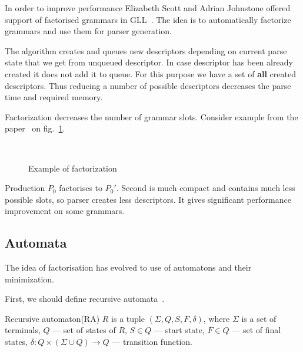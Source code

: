 \documentclass[runningheads,a4paper]{llncs}
\begin{document}
In order to improve performance Elizabeth Scott and Adrian Johnstone offered support of factorised grammars in GLL~\cite{scott2016structuring}. 
The idea is to automatically factorize grammars and use them for parser generation. 

The algorithm creates and queues new descriptors depending on current parse state that we get from unqueued descriptor. 
In case descriptor has been already created it does not add it to queue. For this purpose we have a set of
\textbf{all} created descriptors. Thus reducing a number of possible descriptors decreases the parse time
and required memory.

Factorization decreases the number of grammar slots. 
Consider example from the paper~\cite{scott2016structuring} on fig.~\ref{fig:ExampleOfFactorization}.

\begin{figure}
    \centering
    ~
    \caption{Example of factorization}
    \label{fig:ExampleOfFactorization}
\end{figure}
Production $P_0$ factorises to $P_0'$.
Second is much compact and contains much less possible slots, 
so parser creates less descriptors.
It gives significant performance improvement on some grammars.

\subsection{Automata}
The idea of factorisation has evolved to use of automatons and their minimization.

First, we should define recursive automata~\cite{tellier2006learning}.

\begin{mydef}
    Recursive automaton(RA) $R$ is a tuple $(\Sigma, Q, S, F, \delta)$, where
    $\Sigma$ is a set of terminals,
    $Q$ --- set of states of $R$,
    $S \in Q$ --- start state,
    $F \in Q$ --- set of final states,
    $\delta : Q \times (\Sigma \cup Q) \to Q$ --- transition function.
\end{mydef}
\end{document}
